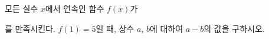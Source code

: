 모든 실수 $x$에서 연속인 함수 $f(x)$가\par\smallskip{}\par\smallskip\noindent 를 만족시킨다. $f(1)=5$일 때, 상수 $a$, $b$에 대하여 $a-b$의 값을 구하시오.
